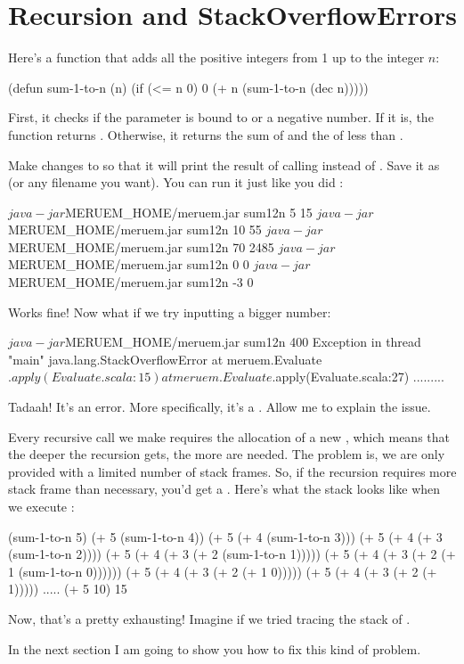 \section{Recursion and StackOverflowErrors}

Here's a function that adds all the positive integers from 1 up to the integer $n$: 

\begin{Meruem}
(defun sum-1-to-n (n)
  (if (<= n 0)
    0    
    (+ n (sum-1-to-n (dec n)))))
\end{Meruem}

First, it checks if the parameter is bound to  or a negative number. If it is, the function returns . Otherwise, it returns the sum of  and the  of  less than . 

Make changes to  so that it will print the result of calling  instead of .  Save it as  (or any filename you want). You can run it just like you did :

\begin{REPL}
$ java -jar $MERUEM_HOME/meruem.jar sum12n 5
15
$ java -jar $MERUEM_HOME/meruem.jar sum12n 10
55
$ java -jar $MERUEM_HOME/meruem.jar sum12n 70
2485
$ java -jar $MERUEM_HOME/meruem.jar sum12n 0
0
$ java -jar $MERUEM_HOME/meruem.jar sum12n -3
0
\end{REPL}

Works fine! Now what if we try inputting a bigger number:

\begin{REPL}
$ java -jar $MERUEM_HOME/meruem.jar sum12n 400
Exception in thread "main" java.lang.StackOverflowError
	at meruem.Evaluate$.apply(Evaluate.scala:15)
	at meruem.Evaluate$.apply(Evaluate.scala:27)
.........
\end{REPL}

Tadaah! It's an error. More specifically, it's a . Allow me to explain the issue. 

Every recursive call we make requires the allocation of a new , which means that the deeper the recursion gets, the more  are needed. The problem is, we are only provided with a limited number of stack frames. So, if the recursion requires more stack frame than necessary, you'd get a . Here's what the stack looks like when we execute :

\begin{REPL}
(sum-1-to-n 5)
(+ 5 (sum-1-to-n 4))
(+ 5 (+ 4 (sum-1-to-n 3)))
(+ 5 (+ 4 (+ 3 (sum-1-to-n 2))))
(+ 5 (+ 4 (+ 3 (+ 2 (sum-1-to-n 1)))))
(+ 5 (+ 4 (+ 3 (+ 2 (+ 1 (sum-1-to-n 0))))))
(+ 5 (+ 4 (+ 3 (+ 2 (+ 1 0)))))
(+ 5 (+ 4 (+ 3 (+ 2 (+ 1)))))
.....
(+ 5 10)
15
\end{REPL}

Now, that's a pretty exhausting! Imagine if we tried tracing the stack of . 

In the next section I am going to show you how to fix this kind of problem.